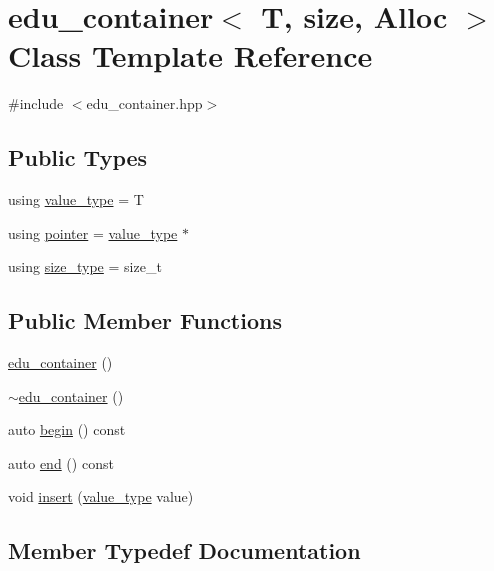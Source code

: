 \hypertarget{classedu__container}{}\section{edu\+\_\+container$<$ T, size, Alloc $>$ Class Template Reference}
\label{classedu__container}


{\ttfamily \#include $<$edu\+\_\+container.\+hpp$>$}

\subsection*{Public Types}
\begin{DoxyCompactItemize}
\item 
using \hyperlink{classedu__container_a1a1a693013d3f6fd261d6e3532ec2a11}{value\+\_\+type} = T
\item 
using \hyperlink{classedu__container_a20f66877e7a564cb76a3f7d5a5f6ff59}{pointer} = \hyperlink{classedu__container_a1a1a693013d3f6fd261d6e3532ec2a11}{value\+\_\+type} $\ast$
\item 
using \hyperlink{classedu__container_a2a83d6329e026dd119b001b0e0d9c9f5}{size\+\_\+type} = size\+\_\+t
\end{DoxyCompactItemize}
\subsection*{Public Member Functions}
\begin{DoxyCompactItemize}
\item 
\hyperlink{classedu__container_a4facfaba4cbdd4b8845e05f7b29dfc46}{edu\+\_\+container} ()
\item 
\hyperlink{classedu__container_a350dad874b99e47a93b074a49841ccf1}{$\sim$edu\+\_\+container} ()
\item 
auto \hyperlink{classedu__container_a7b97b3fa13a5bb3357062687bd408f7b}{begin} () const
\item 
auto \hyperlink{classedu__container_aa32c0fa70c685557a5d35fe48a8fa1c2}{end} () const
\item 
void \hyperlink{classedu__container_ae82187bdb440b98d824bc6752c940e51}{insert} (\hyperlink{classedu__container_a1a1a693013d3f6fd261d6e3532ec2a11}{value\+\_\+type} value)
\end{DoxyCompactItemize}


\subsection{Member Typedef Documentation}
\mbox{\label{classedu__container_a20f66877e7a564cb76a3f7d5a5f6ff59}} 
